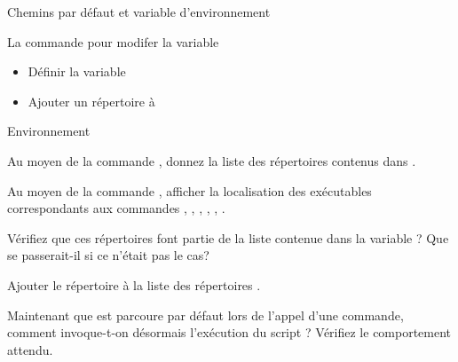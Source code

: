 \begin{frame}{Chemins par défaut et variable d'environnement}
  \begin{block}{La commande  pour modifer la variable
      }
    \begin{itemize}
    \item Définir la variable 
      \begin{center}
        \small{  }
      \end{center}
    \item Ajouter un répertoire à 
      \begin{center}
        \small{  }
      \end{center}
    \end{itemize}
  \end{block}
\end{frame}
\begin{exercice}
  \begin{exercicelet}{Environnement}
    \begin{questions}
    \item Au moyen de la commande , donnez la liste des répertoires
      contenus dans .
    \item Au moyen de la commande , afficher la localisation des
      exécutables correspondants aux commandes , , ,
      , , .
    \item Vérifiez que ces répertoires font partie de la liste contenue dans
      la variable ? Que se passerait-il si ce n'était pas le cas?
    \item Ajouter le répertoire  à la liste des répertoires
      .
    \item Maintenant que  est parcoure par défaut lors de
      l'appel d'une commande, comment invoque-t-on désormais l'exécution du
      script ? Vérifiez le comportement attendu.
    \end{questions}
  \end{exercicelet}
\end{exercice}

